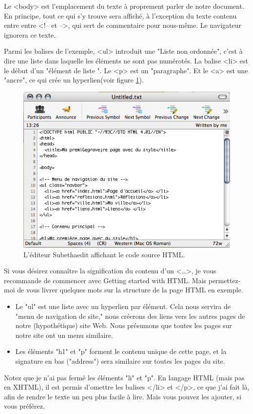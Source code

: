  Le <body> est l'emplacement du texte à proprement parler de notre document. En principe, tout ce qui s'y trouve sera affiché, à l'exception du texte contenu entre entre <!-- et -->, qui sert de commentaire pour nous-même. Le navigateur ignorera ce texte.
 
 Parmi les balises de l'exemple, <ul> introduit une "Liste non ordonnée", c'est à dire une liste dans laquelle les éléments ne sont pas numérotés. La balise <li> est le début d'un "élément de liste ". Le <p> est un "paragraphe". Et le <a> est une "ancre", ce qui crée un hyperlien(voir figure \ref{fig:screen2}). 

\begin{figure}[t]
	\begin{center}
		\includegraphics{voronin/img/capture.png}
		\caption{L'éditeur Subethaedit affichant le code source HTML.}
		\label{fig:screen2}		
	\end{center}
\end{figure}
Si vous désirez connaître la signification du contenu d'un <…>, je vous recommande de commencer avec Getting started with HTML. Mais permettez-moi de vous livrer quelques mots sur la structure de la page HTML en exemple.
\begin{itemize}
	\item Le "ul" est une liste avec un hyperlien par élément. Cela nous servira de "menu de navigation de site," nous créerons des liens vers les autres pages de notre (hypothétique) site Web. Nous présumons que toutes les pages sur notre site ont un menu similaire.
	\item Les éléments "h1" et "p" forment le contenu unique de cette page, et la signature en bas ("address") sera similaire sur toutes les pages du site. 
\end{itemize}
Notez que je n'ai pas fermé les éléments "li" et "p". En langage HTML (mais pas en XHTML), il est permis d'omettre les balises </li> et </p>, ce que j'ai fait là, afin de rendre le texte un peu plus facile à lire. Mais vous pouvez les ajouter, si vous préférez. 
\normalsize

